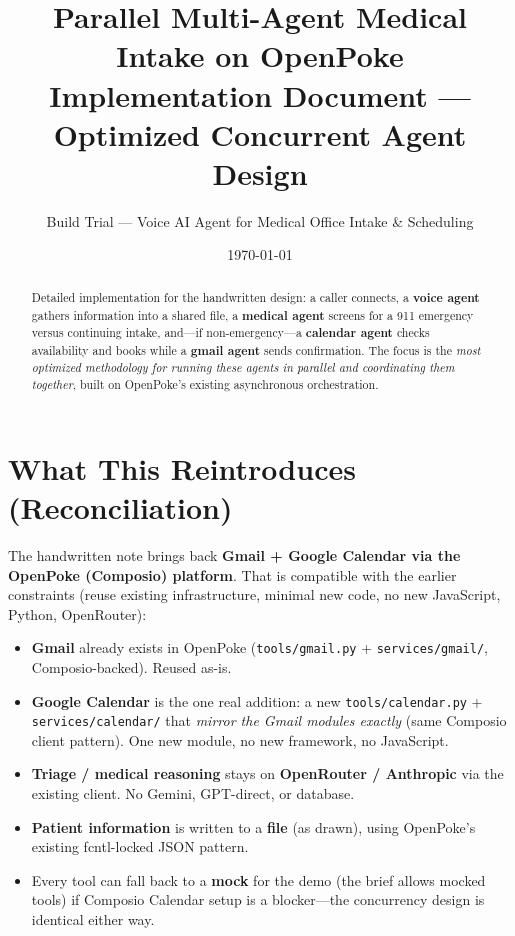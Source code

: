 \documentclass[11pt,a4paper]{article}
\title{\textbf{Parallel Multi-Agent Medical Intake on OpenPoke}\\[4pt]
\large Implementation Document — Optimized Concurrent Agent Design}
\author{Build Trial — Voice AI Agent for Medical Office Intake \& Scheduling}
\date{\today}
\begin{document}
\maketitle
\thispagestyle{fancy}

\begin{abstract}
\noindent Detailed implementation for the handwritten design: a caller connects, a \textbf{voice agent} gathers
information into a shared file, a \textbf{medical agent} screens for a 911 emergency versus continuing intake,
and---if non-emergency---a \textbf{calendar agent} checks availability and books while a \textbf{gmail agent}
sends confirmation. The focus is the \emph{most optimized methodology for running these agents in parallel and
coordinating them together}, built on OpenPoke's existing asynchronous orchestration.
\end{abstract}

\tableofcontents
\newpage

\section{What This Reintroduces (Reconciliation)}

The handwritten note brings back \textbf{Gmail + Google Calendar via the OpenPoke (Composio) platform}. That is
compatible with the earlier constraints (reuse existing infrastructure, minimal new code, no new JavaScript,
Python, OpenRouter):

\begin{itemize}[leftmargin=*]
  \item \textbf{Gmail} already exists in OpenPoke (\texttt{tools/gmail.py} + \texttt{services/gmail/},
  Composio-backed). Reused as-is.
  \item \textbf{Google Calendar} is the one real addition: a new \texttt{tools/calendar.py} +
  \texttt{services/calendar/} that \emph{mirror the Gmail modules exactly} (same Composio client pattern).
  One new module, no new framework, no JavaScript.
  \item \textbf{Triage / medical reasoning} stays on \textbf{OpenRouter / Anthropic} via the existing client.
  No Gemini, GPT-direct, or database.
  \item \textbf{Patient information} is written to a \textbf{file} (as drawn), using OpenPoke's existing
  fcntl-locked JSON pattern.
  \item Every tool can fall back to a \textbf{mock} for the demo (the brief allows mocked tools) if Composio
  Calendar setup is a blocker---the concurrency design is identical either way.
\end{itemize}
\end{document}
